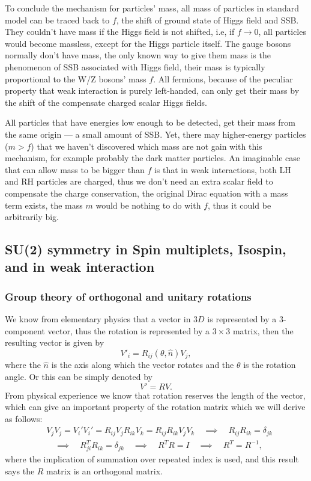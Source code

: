 \documentclass{article}
\newcommand{\be}{\begin{equation}}
\newcommand{\ee}{\end{equation}}
\renewcommand{\1}{\left}
\renewcommand{\2}{\right}
\newcommand{\del}{\delta}
\renewcommand{\th}{\theta}
\begin{document}
To conclude the mechanism for particles' mass, all mass of particles in standard model can be traced back to $f$, the shift of ground state of Higgs field and SSB. They couldn't have mass if the Higgs field is not shifted, i.e, if $f\rightarrow 0$, all particles would become massless, except for the Higgs particle itself. The gauge bosons normally don't have mass, the only known way to give them mass is the phenomenon of SSB associated with Higgs field, their mass is typically proportional to the W/Z bosons' mass $f$. All fermions, because of the peculiar property that weak interaction is purely left-handed, can only get their mass by the shift of the compensate charged scalar Higgs fields.

All particles that have energies low enough to be detected, get their mass from the same origin --- a small amount of SSB. Yet, there may higher-energy particles ($m>f$) that we haven't discovered which mass are not gain with this mechanism, for example probably the dark matter particles. An imaginable case that can allow mass to be bigger than $f$ is that in weak interactions, both LH and RH particles are charged, thus we don't need an extra scalar field to compensate the charge conservation, the original Dirac equation with a mass term exists, the mass $m$ would be nothing to do with $f$, thus it could be arbitrarily big.












\newpage
\subsection{SU(2) symmetry in Spin multiplets, Isospin, and in weak interaction}
\subsubsection{Group theory of orthogonal and unitary rotations}
We know from elementary physics that a vector in $3D$ is represented by a $3$-component vector, thus the rotation is represented by a $3\times 3$ matrix, then the resulting vector is given by
\be
V'_i=R_{ij}(\th,\hat n) V_j,
\ee
where  the $\hat n$ is the axis along which the vector rotates and the $\th$ is the rotation angle. Or this can be simply denoted by 
\be V'=RV. \ee
From physical experience we know that rotation reserves the length of the vector, which can give an important property of the rotation matrix which we will derive as follows:
\be\begin{split}
&V_jV_j=V_i'V_i'=R_{ij}V_jR_{ik}V_k=R_{ij}R_{ik}V_jV_k \quad\implies\quad R_{ij}R_{ik}=\del_{jk}  \\
&\quad\implies\quad R_{ji}^TR_{ik}=\del_{jk}\quad\implies\quad R^TR=I \quad\implies\quad R^T=R^{-1},
\end{split}\ee
where the implication of summation over repeated index is used, and this result says the $R$ matrix is an orthogonal matrix.
\end{document}
